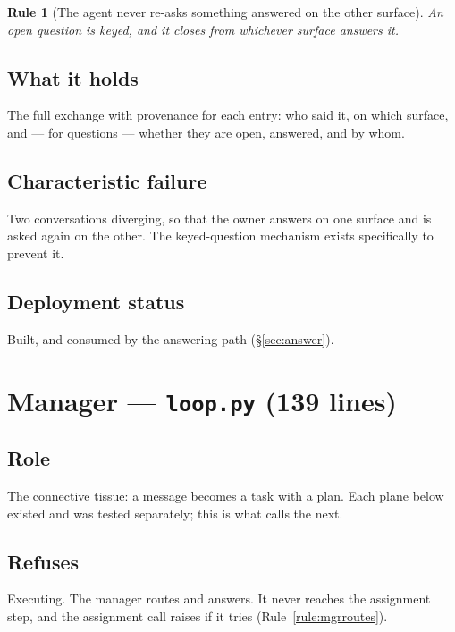 \documentclass[11pt]{article}
\newtheorem{drule}{Rule}
\newcommand{\code}[1]{\texttt{\small #1}}
\begin{document}
\begin{drule}[The agent never re-asks something answered on the other surface]
\label{rule:noreask}
An open question is keyed, and it closes from whichever surface answers it.
\end{drule}

\subsection{What it holds}

The full exchange with provenance for each entry: who said it, on which surface, and --- for questions --- whether they are open, answered, and by whom.

\subsection{Characteristic failure}

Two conversations diverging, so that the owner answers on one surface and is asked again on the other. The keyed-question mechanism exists specifically to prevent it.

\subsection{Deployment status}

Built, and consumed by the answering path (\S\ref{sec:answer}).

\section{Manager --- \code{loop.py} (139 lines)}
\label{sec:manager}

\subsection{Role}

The connective tissue: a message becomes a task with a plan. Each plane below existed and was tested separately; this is what calls the next.

\subsection{Refuses}

Executing. The manager routes and answers. It never reaches the assignment step, and the assignment call raises if it tries (Rule~\ref{rule:mgrroutes}).
\end{document}
